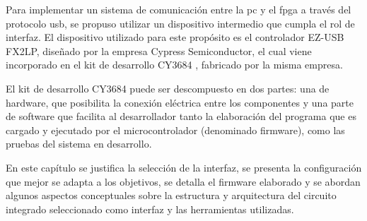 Para implementar un sistema de comunicación entre la \acrshort{pc} y el \acrshort{fpga} a través del protocolo \acrshort{usb}, se propuso utilizar un dispositivo intermedio que cumpla el rol de interfaz. El dispositivo utilizado para este propósito es el controlador EZ-USB FX2LP, diseñado por la empresa Cypress Semiconductor, el cual viene incorporado en el kit de desarrollo CY3684 \cite{CypressSemiconductor2014cy3684}, fabricado por la misma empresa.

El kit de desarrollo CY3684 puede ser descompuesto en dos partes: una de hardware, que posibilita la conexión eléctrica entre los componentes y una parte de software que facilita al desarrollador tanto la elaboración del programa que es cargado y ejecutado por el microcontrolador (denominado firmware), como las pruebas del sistema en desarrollo.

En este capítulo se justifica la selección de la interfaz, se presenta la configuración que mejor se adapta a los objetivos, se detalla el firmware elaborado y se abordan algunos aspectos conceptuales sobre la estructura y arquitectura del circuito integrado seleccionado como interfaz y las herramientas utilizadas.%



